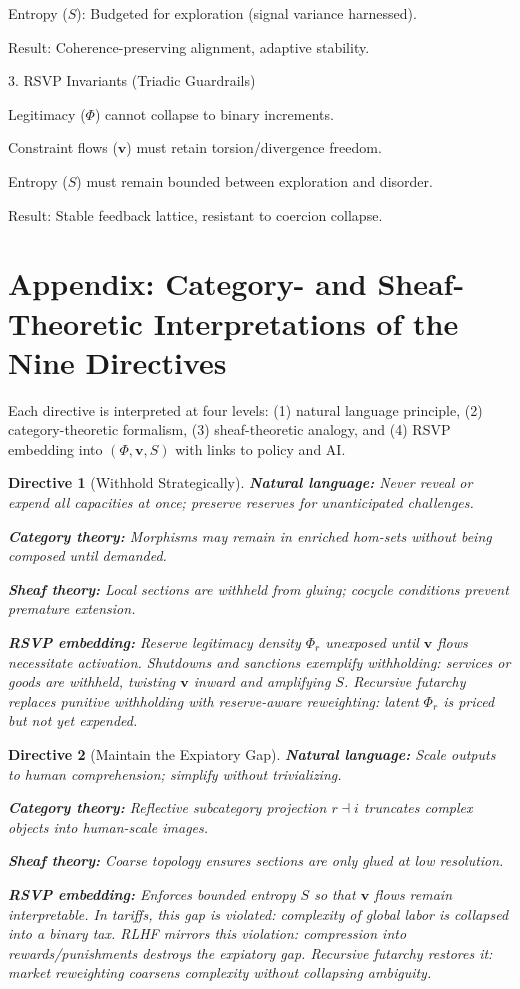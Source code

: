 \documentclass{article}
\newtheorem{directive}{Directive}
\begin{document}
Entropy ($S$): Budgeted for exploration (signal variance harnessed).

Result: Coherence-preserving alignment, adaptive stability.


3. RSVP Invariants (Triadic Guardrails)

Legitimacy ($\Phi$) cannot collapse to binary increments.

Constraint flows ($\mathbf{v}$) must retain torsion/divergence freedom.

Entropy ($S$) must remain bounded between exploration and disorder.

Result: Stable feedback lattice, resistant to coercion collapse.

\section{Appendix: Category- and Sheaf-Theoretic Interpretations of the Nine Directives}
\label{app:directives-categorical}

Each directive is interpreted at four levels: 
(1) natural language principle, 
(2) category-theoretic formalism, 
(3) sheaf-theoretic analogy, 
and (4) RSVP embedding into $(\Phi,\mathbf{v},S)$ with links to policy and AI.

\begin{directive}[Withhold Strategically]
\textbf{Natural language:} Never reveal or expend all capacities at once; preserve reserves for unanticipated challenges.  

\textbf{Category theory:} Morphisms may remain in enriched hom-sets without being composed until demanded.  

\textbf{Sheaf theory:} Local sections are withheld from gluing; cocycle conditions prevent premature extension.  

\textbf{RSVP embedding:} Reserve legitimacy density $\Phi_r$ unexposed until $\mathbf{v}$ flows necessitate activation.  
Shutdowns and sanctions exemplify withholding: services or goods are withheld, twisting $\mathbf{v}$ inward and amplifying $S$.  
Recursive futarchy replaces punitive withholding with reserve-aware reweighting: latent $\Phi_r$ is priced but not yet expended.
\end{directive}

\begin{directive}[Maintain the Expiatory Gap]
\textbf{Natural language:} Scale outputs to human comprehension; simplify without trivializing.  

\textbf{Category theory:} Reflective subcategory projection $r \dashv i$ truncates complex objects into human-scale images.  

\textbf{Sheaf theory:} Coarse topology ensures sections are only glued at low resolution.  

\textbf{RSVP embedding:} Enforces bounded entropy $S$ so that $\mathbf{v}$ flows remain interpretable.  
In tariffs, this gap is violated: complexity of global labor is collapsed into a binary tax.  
RLHF mirrors this violation: compression into rewards/punishments destroys the expiatory gap.  
Recursive futarchy restores it: market reweighting coarsens complexity without collapsing ambiguity.
\end{directive}
\end{document}
